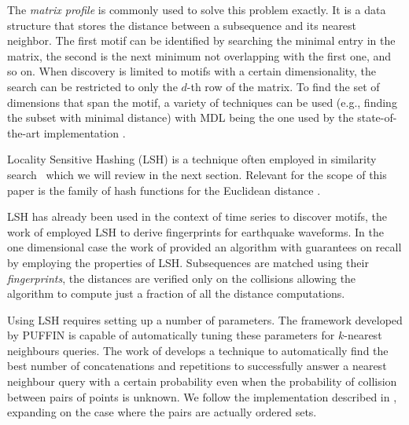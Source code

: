 The \textit{matrix profile} \cite{keoghMP} is commonly used to solve this problem exactly. It is a data structure that stores the distance between a subsequence and its nearest neighbor. The first motif can be identified by searching the minimal entry in the matrix, the second is the next minimum not overlapping with the first one, and so on. When discovery is limited to motifs with a certain dimensionality, the search can be restricted to only the $d$-th row of the matrix. To find the set of dimensions that span the motif, a variety of techniques can be used (e.g., finding the subset with minimal distance) with MDL being the one used by the state-of-the-art implementation \cite{Law2019}.


Locality Sensitive Hashing (LSH) is a technique often employed in similarity search~\cite{lsh, 2020mining} which we will review in the next section.
Relevant for the scope of this paper is the family of hash functions for the Euclidean distance \cite{datar2004}.

LSH has already been used in the context of time series to discover motifs, the work of \cite{LSHearthquake} employed LSH to derive fingerprints for earthquake waveforms.
In the one dimensional case the work of \cite{attimo} provided an algorithm with guarantees on recall by employing the properties of LSH. Subsequences are matched using their \textit{fingerprints}, the distances are verified only on the collisions allowing the algorithm to compute just a fraction of all the distance computations.

Using LSH requires setting up a number of parameters. The framework developed by PUFFIN \cite{puffinn} is capable of automatically tuning these parameters for $k$-nearest neighbours queries. The work of \cite{confsampling} develops a technique to automatically find the best number of concatenations and repetitions to successfully answer a nearest neighbour query with a certain probability even when the probability of collision between pairs of points is unknown. We follow the implementation described in \cite{puffinn}, expanding on the case where the pairs are actually ordered sets.
